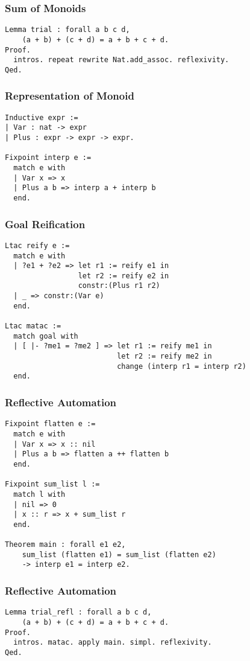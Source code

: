 \documentclass{beamer}
\begin{document}
\begin{frame}[fragile]
  \frametitle{Sum of Monoids}
\begin{verbatim}
Lemma trial : forall a b c d,
    (a + b) + (c + d) = a + b + c + d.
Proof.
  intros. repeat rewrite Nat.add_assoc. reflexivity.
Qed.
\end{verbatim}
\end{frame}

\begin{frame}[fragile]
  \frametitle{Representation of Monoid}
\begin{verbatim}
Inductive expr :=
| Var : nat -> expr
| Plus : expr -> expr -> expr.

Fixpoint interp e :=
  match e with
  | Var x => x
  | Plus a b => interp a + interp b
  end.
\end{verbatim}
\end{frame}

\begin{frame}[fragile]
  \frametitle{Goal Reification}
\begin{verbatim}
Ltac reify e :=
  match e with
  | ?e1 + ?e2 => let r1 := reify e1 in
                 let r2 := reify e2 in
                 constr:(Plus r1 r2)
  | _ => constr:(Var e)
  end.

Ltac matac :=
  match goal with
  | [ |- ?me1 = ?me2 ] => let r1 := reify me1 in
                          let r2 := reify me2 in
                          change (interp r1 = interp r2)
  end.
\end{verbatim}
\end{frame}

\begin{frame}[fragile]
  \frametitle{Reflective Automation}
  \vspace{-.5em}
\begin{verbatim}
Fixpoint flatten e :=
  match e with
  | Var x => x :: nil
  | Plus a b => flatten a ++ flatten b
  end.

Fixpoint sum_list l :=
  match l with
  | nil => 0
  | x :: r => x + sum_list r
  end.

Theorem main : forall e1 e2,
    sum_list (flatten e1) = sum_list (flatten e2)
    -> interp e1 = interp e2.
\end{verbatim}
\end{frame}

\begin{frame}[fragile]
  \frametitle{Reflective Automation}
\begin{verbatim}
Lemma trial_refl : forall a b c d,
    (a + b) + (c + d) = a + b + c + d.
Proof.
  intros. matac. apply main. simpl. reflexivity.
Qed.
\end{verbatim}
\end{frame}
\end{document}
